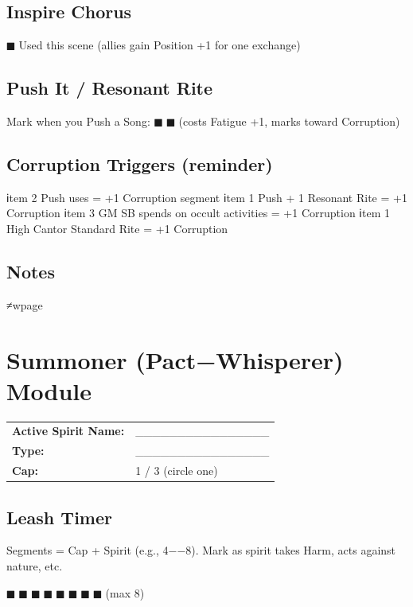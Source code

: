 \documentclass[11pt]{article}
\begin{document}
\subsection*{Inspire Chorus}
$■$ Used this scene (allies gain Position +1 for one exchange)

\subsection*{Push It / Resonant Rite}
Mark when you Push a Song: $■$ $■$ (costs Fatigue +1, marks toward Corruption)

\subsection*{Corruption Triggers (reminder)}
\begin{itemize}
  ℹtem 2 Push uses = +1 Corruption segment
  ℹtem 1 Push + 1 Resonant Rite = +1 Corruption
  ℹtem 3 GM SB spends on occult activities = +1 Corruption
  ℹtem 1 High Cantor Standard Rite = +1 Corruption
\end{itemize}

\subsection*{Notes}
\vspace{5cm}
≠wpage

\section*{Summoner (Pact−Whisperer) Module}

\noindent
\begin{tabularx}{\textwidth}{X X}
\textbf{Active Spirit Name:} & ________________ \\
\textbf{Type:} & ________________ \\
\textbf{Cap:} & 1 / 3 (circle one) \\
\end{tabularx}

\subsection*{Leash Timer }
Segments = Cap + Spirit (e.g., 4−−8). Mark as spirit takes Harm, acts against nature, etc.
\begin{center}
$■$ $■$ $■$ $■$ $■$ $■$ $■$ $■$ (max 8)
\end{center}
\end{document}
